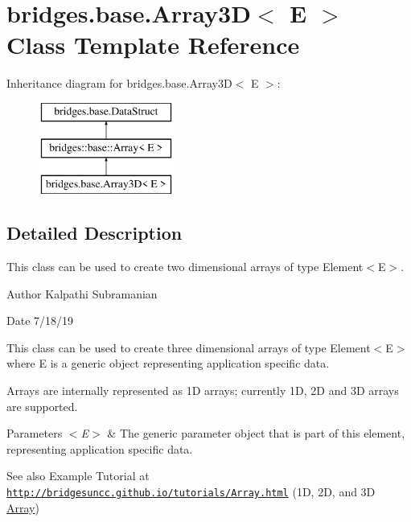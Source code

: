 \hypertarget{classbridges_1_1base_1_1_array3_d}{}\section{bridges.\+base.\+Array3D$<$ E $>$ Class Template Reference}
\label{classbridges_1_1base_1_1_array3_d}
Inheritance diagram for bridges.\+base.\+Array3D$<$ E $>$\+:\begin{figure}[H]
\begin{center}
\leavevmode
\includegraphics[height=3.000000cm]{classbridges_1_1base_1_1_array3_d}
\end{center}
\end{figure}


\subsection{Detailed Description}
This class can be used to create two dimensional arrays of type Element$<$\+E$>$. 

\begin{DoxyAuthor}{Author}
Kalpathi Subramanian
\end{DoxyAuthor}
\begin{DoxyDate}{Date}
7/18/19
\end{DoxyDate}
This class can be used to create three dimensional arrays of type Element$<$\+E$>$ where E is a generic object representing application specific data.

Arrays are internally represented as 1D arrays; currently 1D, 2D and 3D arrays are supported.


\begin{DoxyParams}{Parameters}
{\em $<$\+E$>$} & The generic parameter object that is part of this element, representing application specific data.\\
\hline
\end{DoxyParams}
\begin{DoxySeeAlso}{See also}
Example Tutorial at ~\newline
 \href{http://bridgesuncc.github.io/tutorials/Array.html}{\tt http\+://bridgesuncc.\+github.\+io/tutorials/\+Array.\+html} (1D, 2D, and 3D \mbox{\hyperlink{classbridges_1_1base_1_1_array}{Array}})~\newline
 
\end{DoxySeeAlso}
